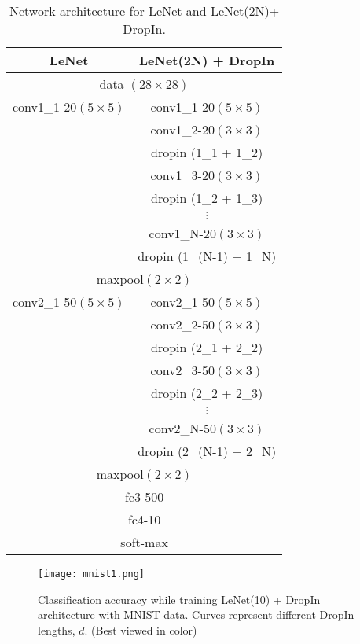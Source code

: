 \documentclass[10pt,twocolumn,letterpaper]{article}
\newcommand{\dropin}{DropIn }
\newcommand{\dropinNS}{DropIn}
\begin{document}
\begin{table}[htb]
\begin{center}
  \begin{tabular}{| c | c |}
    \hline
      LeNet & LeNet(2N) {\color{red}+ \dropin} \\ \hline
    
     \multicolumn{2}{|c|}{data $(28\times 28 )$} \\ \hline
     conv1\_1-20$(5\times 5)$ & conv1\_1-20$(5\times 5)$ \\ 
        & conv1\_2-20$(3\times 3)$ \\ 
       & {\color{red}dropin (1\_1 + 1\_2)} \\
        & conv1\_3-20$(3\times 3)$ \\ 
       & {\color{red}dropin (1\_2 + 1\_3)} \\ 
         & $\vdots$ \\ 
        & conv1\_N-20$(3\times 3)$ \\ 
       & {\color{red}dropin (1\_(N-1) + 1\_N)} \\ \hline
	\multicolumn{2}{|c|}{maxpool$(2\times2)$} \\ \hline

     conv2\_1-50$(5\times 5)$ & conv2\_1-50$(5\times 5)$ \\ 
       & conv2\_2-50$(3\times 3)$ \\ 
      & {\color{red}dropin (2\_1 + 2\_2)} \\
      & conv2\_3-50$(3\times 3)$ \\ 
      & {\color{red}dropin (2\_2 + 2\_3)} \\ 
       & $\vdots$ \\ 
      & conv2\_N-50$(3\times 3)$ \\ 
      & {\color{red}dropin (2\_(N-1) + 2\_N)} \\ \hline
\multicolumn{2}{|c|}{maxpool$(2\times2)$} \\ \hline
\multicolumn{2}{|c|}{fc3-500} \\ \hline
\multicolumn{2}{|c|}{fc4-10} \\ \hline
\multicolumn{2}{|c|}{soft-max} \\ \hline
  \end{tabular}
  \caption{Network architecture for LeNet and LeNet(2N)+ \dropinNS.  }
  \label{tab:lenet_N}
\end{center}
  \vspace{-20pt}
\end{table}

\begin{figure}[tbh]
\begin{center}
   \texttt{[image: mnist1.png]}
\end{center}
  \vspace{-10pt}
   \caption{Classification accuracy while training LeNet(10) + \dropin architecture with MNIST data. Curves represent different \dropin lengths, $d$.  (Best viewed in color)  
}
\label{fig:lenet_10}
  \vspace{-10pt}
\end{figure}
\end{document}
